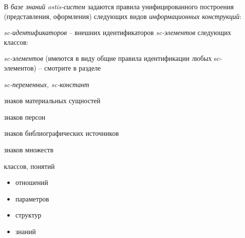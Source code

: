 \begin{SCn}
\begin{scnsubstruct}
{            В \textit{базе знаний ostis-систем} задаются правила унифицированного построения
            (представления, оформления) следующих видов \textit{информационных
                конструкций}:
            \begin{scnitemize}
                \item{\textit{sc-идентификаторов} -- внешних идентификаторов
                            \textit{sc-элементов} следующих классов:
                            \begin{scnitemizeii}
                                \item{\textit{sc-элементов} (имеются в виду общие правила идентификации
                                            любых sc-элементов) -- смотрите в разделе}
                                \item{\textit{sc-переменных, sc-констант}}
                                \item{знаков материальных сущностей
                                            \begin{scnitemizeiii}
                                                \item{знаков персон}
                                                \item{знаков библиографических источников}
                                            \end{scnitemizeiii}}
                                \item{знаков множеств
                                            \begin{scnitemizeiii}
                                                \item{классов, понятий
                                                            \begin{itemize}
                                                                \item{отношений}
                                                                \item{параметров}
                                                                \item{структур}
                                                                \item{знаний}
                                                            \end{itemize}
                                                      }
                                            \end{scnitemizeiii}}

\end{scnitemizeii}}
\end{scnitemize}}
\end{scnsubstruct}
\end{SCn}
